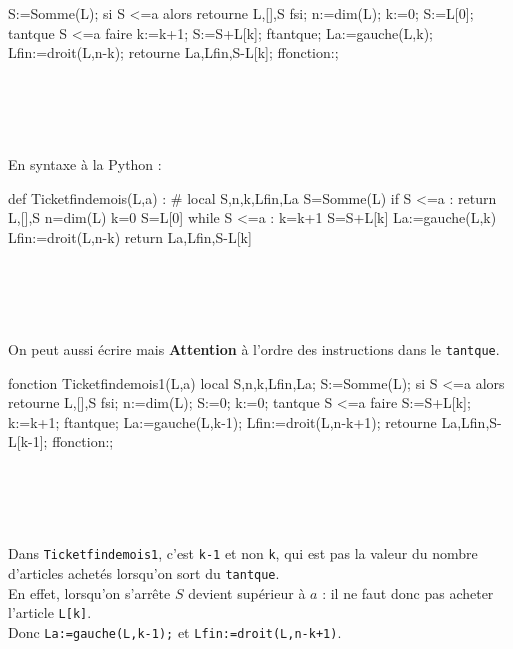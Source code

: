 \documentclass[12pt,a4paper]{book}
\begin{document}
\begin{giacjshere}
\begin{giaconload}
 S:=Somme(L);
 si S <=a alors retourne L,[],S fsi;
 n:=dim(L);
 k:=0;
 S:=L[0];
 tantque S <=a faire 
   k:=k+1;
   S:=S+L[k];
  ftantque;
 La:=gauche(L,k);
 Lfin:=droit(L,n-k);
 retourne La,Lfin,S-L[k];
ffonction:;
\end{giaconload}
\\
\\
\\
\\
En syntaxe \`a la Python :
\begin{giacprog}
def Ticketfindemois(L,a) : 
    # local S,n,k,Lfin,La
    S=Somme(L)
    if S <=a :
        return L,[],S
    n=dim(L)
    k=0
    S=L[0]
    while S <=a : 
        k=k+1
        S=S+L[k]
    La:=gauche(L,k)
    Lfin:=droit(L,n-k)
    return La,Lfin,S-L[k]
\end{giacprog}
\\
\\
\\
\\
On peut aussi \'ecrire  mais {\bf Attention} \`a 
l'ordre des instructions dans le {\tt tantque}. 
\begin{giaconload}
fonction Ticketfindemois1(L,a) 
 local S,n,k,Lfin,La;
 S:=Somme(L);
 si S <=a alors retourne L,[],S fsi;
 n:=dim(L);
 S:=0;
 k:=0;
 tantque S <=a faire 
   S:=S+L[k];
   k:=k+1;
 ftantque;
 La:=gauche(L,k-1);
 Lfin:=droit(L,n-k+1);
 retourne La,Lfin,S-L[k-1];
ffonction:;
\end{giaconload}
\\
\\
\\
\\
Dans {\tt Ticketfindemois1}, c'est  {\tt k-1} et non {\tt k}, qui est pas la 
valeur du nombre d'articles achet\'es lorsqu'on sort du {\tt tantque}.\\
En effet, lorsqu'on s'arr\^ete  $S$ devient 
sup\'erieur \`a $a$ : il ne faut donc pas acheter l'article {\tt L[k]}.\\
Donc {\tt La:=gauche(L,k-1);} et {\tt Lfin:=droit(L,n-k+1)}.\\


\end{giacjshere}
\end{document}
